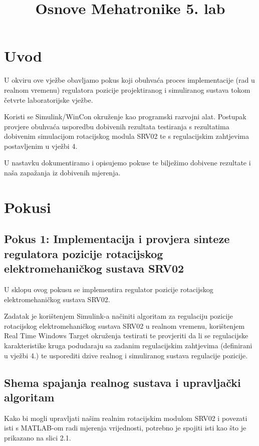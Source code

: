 \documentclass[12pt,a4paper]{article}
\title{Osnove Mehatronike 5. lab}
\begin{document}
\section{Uvod}
U okviru ove vježbe obavljamo pokus koji obuhvaća proces implementacije
(rad u realnom vremenu) regulatora pozicije projektiranog i simuliranog sustava tokom četvrte laboratorijske vježbe. 

Koristi se Simulink/WinCon okruženje kao programski razvojni alat. Postupak provjere obuhvaća usporedbu dobivenih rezultata testiranja s rezultatima dobivenim simulacijom rotacijskog modula SRV02 te s regulacijskim zahtjevima postavljenim u vježbi 4.

U nastavku dokumentiramo i opisujemo pokuse te bilježimo dobivene rezultate i naša zapažanja iz dobivenih mjerenja.

\newpage


\section{Pokusi}
\subsection{Pokus 1: Implementacija i provjera sinteze regulatora pozicije rotacijskog elektromehaničkog sustava SRV02}

U sklopu ovog pokusu se implementira regulator pozicije rotacijskog elektromehaničkog sustava SRV02. 

Zadatak je korištenjem Simulink-a načiniti algoritam za regulaciju pozicije rotacijskog elektromehaničkog sustava SRV02 u realnom vremenu, korištenjem Real Time Windows Target okruženja testirati te provjeriti da li se 
regulacijske karakteristike kruga podudaraju sa zadanim regulacijskim zahtjevima
(definirani u vježbi 4.) te usporediti dzive realnog i simuliranog sustava regulacije pozicije.

\subsection{Shema spajanja realnog sustava i upravljački algoritam}

Kako bi mogli upravljati našim realnim rotacijskim modulom SRV02 i povezati isti s MATLAB-om radi mjerenja vrijednosti, potrebno je spojiti isti kao što je prikazano na slici 2.1.
\end{document}
